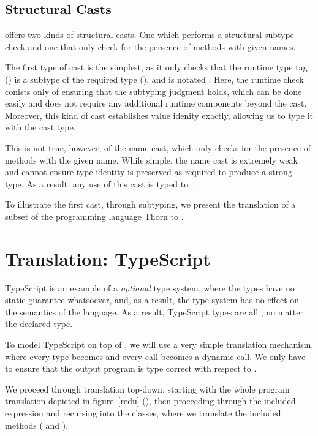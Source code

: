 \documentclass[a4paper,USenglish]{tex/lipics-v2016}
\begin{document}
\subsection{Structural Casts}

\kafka offers two kinds of structural casts. One which performs a structural
subtype check and one that only check for the persence of methods with given
names. 

The first type of cast is the simplest, as it only checks that the runtime type
tag (\C) is a subtype of the required type (\D), and is notated \SubCast\D\e. 
Here, the runtime check conists only of ensuring that the subtyping judgment
holds, which can be done easily and does not require any additional runtime 
components beyond the cast. Moreover, this kind of cast establishes value idenity
exactly, allowing us to type it with the cast type.

This is not true, however, of the name cast, which only checks for the presence
of methods with the given name. While simple, the name cast is
extremely weak and cannot ensure type identity is preserved as required to
produce a strong \kafka type. As a result, any use of this cast is typed to \any.

To illustrate the first cast, through subtyping, we present the 
translation of a subset of the programming language Thorn to \kafka. 

\section{Translation: TypeScript}

TypeScript is an example of a \emph{optional} type system, where the types have
no static guarantee whatsoever, and, as a result, the type system has no effect
on the semantics of the language. As a result, TypeScript types are all \any,
no matter the declared type.

To model TypeScript on top of \kafka, we will use a very simple translation 
mechanism, where every type becomes \any and every call becomes a dynamic call.
We only have to ensure that the output program is type correct with respect to
\kafka.

We proceed through translation top-down, starting with the whole program 
translation depicted in figure~\ref{redu} (), then proceeding 
through the included expression and recursing into the classes, where we 
translate the included methods ( and ).
\end{document}
